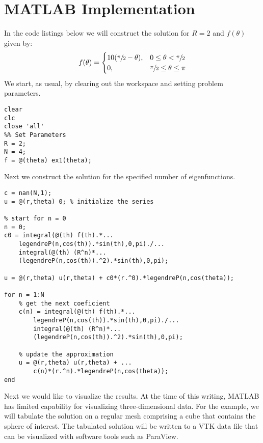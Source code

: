 \section{MATLAB Implementation}
In the code listings below we will construct the solution for $R = 2$ and $f(\theta)$ given by:
\begin{equation*}
f(\theta) = 
\begin{cases}
10(\sfrac{\pi}{2}-\theta), & 0 \le \theta < \sfrac{\pi}{2} \\
0, & \sfrac{\pi}{2} \le \theta \le \pi
\end{cases}
\end{equation*}
We start, as usual, by clearing out the workspace and setting problem parameters.
\begin{lstlisting}[name=lec34-ex, style=myMatlab]
clear
clc
close 'all'
%% Set Parameters
R = 2;
N = 4;
f = @(theta) ex1(theta);
\end{lstlisting}
Next we construct the solution for the specified number of eigenfunctions.
\begin{lstlisting}[name=lec34-ex, style=myMatlab]
%% Construct the Solution
c = nan(N,1);
u = @(r,theta) 0; % initialize the series

% start for n = 0 
n = 0;
c0 = integral(@(th) f(th).*...
    legendreP(n,cos(th)).*sin(th),0,pi)./...
    integral(@(th) (R^n)*...
    (legendreP(n,cos(th)).^2).*sin(th),0,pi);

u = @(r,theta) u(r,theta) + c0*(r.^0).*legendreP(n,cos(theta));    

for n = 1:N 
    % get the next coeficient
    c(n) = integral(@(th) f(th).*...
        legendreP(n,cos(th)).*sin(th),0,pi)./...
        integral(@(th) (R^n)*...
        (legendreP(n,cos(th)).^2).*sin(th),0,pi);
    
    % update the approximation
    u = @(r,theta) u(r,theta) + ...
        c(n)*(r.^n).*legendreP(n,cos(theta)); 
end
\end{lstlisting}
Next we would like to visualize the results.  At the time of this writing, MATLAB has limited capability for visualizing three-dimensional data.  For the example, we will tabulate the solution on a regular mesh comprising a cube that contains the sphere of interest.  The tabulated solution will be written to a VTK data file that can be visualized with software tools such as ParaView.\cite{paraview}
